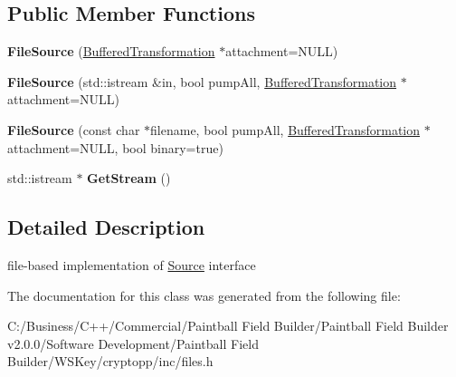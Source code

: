 \subsection*{Public Member Functions}
\begin{DoxyCompactItemize}
\item 
\hypertarget{class_file_source_afaf658f26f1bc1d25bb1b8a6eb3a255c}{
{\bfseries FileSource} (\hyperlink{class_buffered_transformation}{BufferedTransformation} $\ast$attachment=NULL)}
\label{class_file_source_afaf658f26f1bc1d25bb1b8a6eb3a255c}

\item 
\hypertarget{class_file_source_a03a5d2f2116167667587c5ffae2e103c}{
{\bfseries FileSource} (std::istream \&in, bool pumpAll, \hyperlink{class_buffered_transformation}{BufferedTransformation} $\ast$attachment=NULL)}
\label{class_file_source_a03a5d2f2116167667587c5ffae2e103c}

\item 
\hypertarget{class_file_source_a1882e0cbe882e4379b8acf0c7707626f}{
{\bfseries FileSource} (const char $\ast$filename, bool pumpAll, \hyperlink{class_buffered_transformation}{BufferedTransformation} $\ast$attachment=NULL, bool binary=true)}
\label{class_file_source_a1882e0cbe882e4379b8acf0c7707626f}

\item 
\hypertarget{class_file_source_a2d864a4d277e47a88cb2c073b875d561}{
std::istream $\ast$ {\bfseries GetStream} ()}
\label{class_file_source_a2d864a4d277e47a88cb2c073b875d561}

\end{DoxyCompactItemize}


\subsection{Detailed Description}
file-\/based implementation of \hyperlink{class_source}{Source} interface 

The documentation for this class was generated from the following file:\begin{DoxyCompactItemize}
\item 
C:/Business/C++/Commercial/Paintball Field Builder/Paintball Field Builder v2.0.0/Software Development/Paintball Field Builder/WSKey/cryptopp/inc/files.h\end{DoxyCompactItemize}
